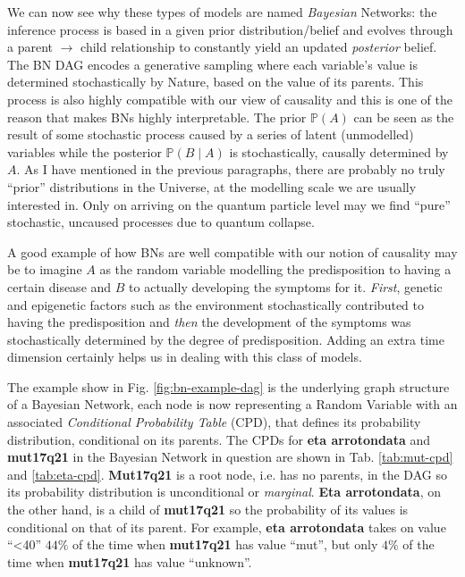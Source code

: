 We can now see why these types of models are named \textit{Bayesian} Networks: the inference process is based in a given prior distribution/belief and evolves through a parent $\rightarrow$ child relationship to constantly yield an updated \textit{posterior} belief.
The BN DAG encodes a generative sampling where each variable's value is determined stochastically by Nature, based on the value of its parents.
This process is also highly compatible with our view of causality and this is one of the reason that makes BNs highly interpretable.
The prior $\mathbb{P}(A)$ can be seen as the result of some stochastic process caused by a series of latent (unmodelled) variables while the posterior $\mathbb{P}(B \mid A)$ is stochastically, causally determined by $A$. 
As I have mentioned in the previous paragraphs, there are probably no truly ``prior'' distributions in the Universe, at the modelling scale we are usually interested in.
Only on arriving on the quantum particle level may we find ``pure'' stochastic, uncaused processes due to quantum collapse.

A good example of how BNs are well compatible with our notion of causality may be to imagine $A$ as the random variable modelling the predisposition to having a certain disease and $B$ to actually developing the symptoms for it.
\textit{First}, genetic and epigenetic factors such as the environment stochastically contributed to having the predisposition and \textit{then} the development of the symptoms was stochastically determined by the degree of predisposition.
Adding an extra time dimension certainly helps us in dealing with this class of models.

The example show in Fig. \ref{fig:bn-example-dag} is the underlying graph structure of a Bayesian Network, each node is now representing a Random Variable with an associated \textit{Conditional Probability Table} (CPD), that defines its probability distribution, conditional on its parents.
The CPDs for \textbf{eta arrotondata} and \textbf{mut17q21} in the Bayesian Network in question are shown in Tab. \ref{tab:mut-cpd} and \ref{tab:eta-cpd}.
\textbf{Mut17q21} is a root node, i.e. has no parents, in the DAG so its probability distribution is unconditional or \textit{marginal}.
\textbf{Eta arrotondata}, on the other hand, is a child of \textbf{mut17q21} so the probability of its values is conditional on that of its parent.
For example, \textbf{eta arrotondata} takes on value \enquote{<40} $44\%$ of the time when \textbf{mut17q21} has value \enquote{mut}, but only $4\%$ of the time when \textbf{mut17q21} has value \enquote{unknown}.

